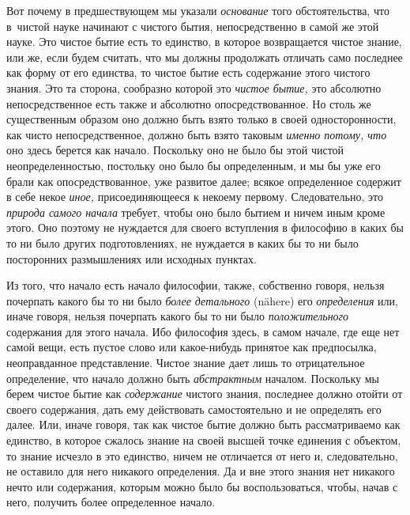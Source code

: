 Вот почему в предшествующем мы указали {\em основание} того обстоятельства, что
в~чистой науке начинают с чистого бытия, непосредственно в самой же этой науке.
Это чистое бытие есть то единство, в которое возвращается чистое знание, или
же, если будем считать, что мы должны продолжать отличать само последнее как
форму от его единства, то чистое бытие есть содержание этого чистого знания.
Это та сторона, сообразно которой это {\em чистое бытие,} это абсолютно
непосредственное есть также и абсолютно опосредствованное. Но столь же
существенным образом оно должно быть взято только в своей односторонности, как
чисто непосредственное, должно быть взято таковым {\em именно потому, что} оно
здесь берется как начало. Поскольку оно не было бы этой чистой
неопределенностью, постольку оно было бы определенным, и мы бы уже его брали
как опосредствованное, уже развитое далее; всякое определенное содержит в себе
некое {\em иное,} присоединяющееся к некоему первому. Следовательно, это
{\em природа самого начала} требует, чтобы оно было бытием и ничем иным кроме
этого. Оно поэтому не нуждается для своего вступления в философию в каких бы то
ни было других подготовлениях, не нуждается в каких бы то ни было посторонних
размышлениях или исходных пунктах.

Из того, что начало есть начало философии, также, собственно говоря, нельзя
почерпать какого бы то ни было {\em более детального} (nähere) его
{\em определения} или, иначе говоря, нельзя почерпать какого бы то ни было
{\em положительного} содержания для этого начала. Ибо философия здесь, в самом
начале, где еще нет самой вещи, есть пустое слово или какое-нибудь принятое как
предпосылка, неоправданное представление. Чистое знание дает лишь то
отрицательное определение, что начало должно быть {\em абстрактным} началом.
Поскольку мы берем чистое бытие как {\em содержание} чистого знания, последнее
должно отойти от своего содержания, дать ему действовать самостоятельно и не
определять его далее. Или, иначе говоря, так как чистое бытие должно быть
рассматриваемо как единство, в которое сжалось знание на своей высшей точке
единения с объектом, то знание исчезло в это единство, ничем не отличается от
него и, следовательно, не оставило для него никакого определения. Да и вне
этого знания нет никакого нечто или содержания, которым можно было бы
воспользоваться, чтобы, начав с него, получить более определенное начало.

